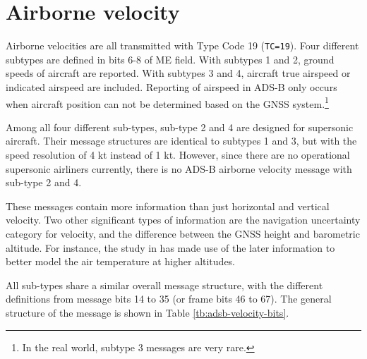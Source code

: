 \chapter{Airborne velocity}

Airborne velocities are all transmitted with Type Code 19 (\texttt{TC=19}). Four different subtypes are defined in bits 6-8 of ME field. With subtypes 1 and 2, ground speeds of aircraft are reported. With subtypes 3 and 4, aircraft true airspeed or indicated airspeed are included. Reporting of airspeed in ADS-B only occurs when aircraft position can not be determined based on the GNSS system.\footnote{In the real world, subtype 3 messages are very rare.}

Among all four different sub-types, sub-type 2 and 4 are designed for supersonic aircraft. Their message structures are identical to subtypes 1 and 3, but with the speed resolution of 4 kt instead of 1 kt. However, since there are no operational supersonic airliners currently, there is no ADS-B airborne velocity message with sub-type 2 and 4.

These messages contain more information than just horizontal and vertical velocity. Two other significant types of information are the navigation uncertainty category for velocity, and the difference between the GNSS height and barometric altitude. For instance, the study in \cite{stone2015} has made use of the later information to better model the air temperature at higher altitudes.

All sub-types share a similar overall message structure, with the different definitions from message bits 14 to 35 (or frame bits 46 to 67). The general structure of the message is shown in Table \ref{tb:adsb-velocity-bits}. 

